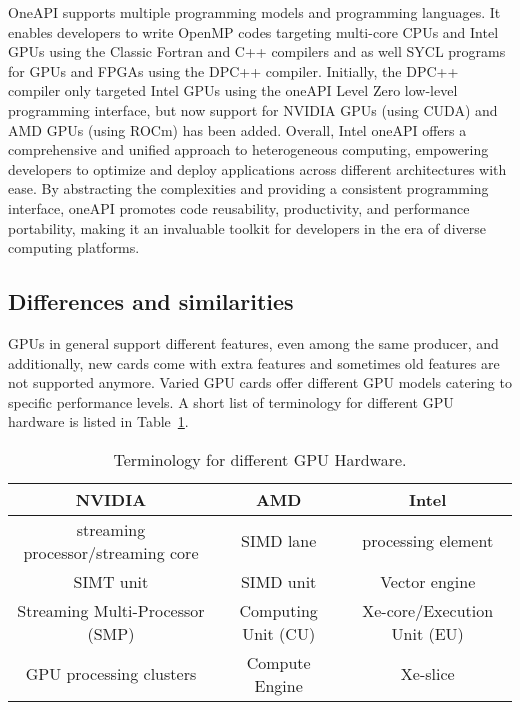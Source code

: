 \par
OneAPI supports multiple programming models and programming languages.
It enables developers to write OpenMP codes targeting multi-core CPUs and Intel GPUs using the Classic Fortran and C++ compilers and as well SYCL programs for GPUs and FPGAs using the DPC++ compiler.
Initially, the DPC++ compiler only targeted Intel GPUs using the oneAPI Level Zero low-level programming interface, but now support for NVIDIA GPUs (using CUDA) and AMD GPUs (using ROCm) has been added.
Overall, Intel oneAPI offers a comprehensive and unified approach to heterogeneous computing, empowering developers to optimize and deploy applications across different architectures with ease.
By abstracting the complexities and providing a consistent programming interface, oneAPI promotes code reusability, productivity, and performance portability, making it an invaluable toolkit for developers in the era of diverse computing platforms.




\subsection{Differences and similarities}


\par
GPUs in general support different features, even among the same producer, and additionally, new cards come with extra features and sometimes old features are not supported anymore.
Varied GPU cards offer different GPU models catering to specific performance levels.
A short list of terminology for different GPU hardware is listed in Table~\ref{tbl:gpu_terminology_nvidia_amd_intel}.


\begin{table}[!h]
\centering\caption{Terminology for different GPU Hardware.}\label{tbl:gpu_terminology_nvidia_amd_intel}
\begin{tabular}{ |c|c|c| } 
\hline
\textbf{NVIDIA} & \textbf{AMD} & \textbf{Intel} \\
\hline
streaming processor/streaming core & SIMD lane & processing element \\
SIMT unit & SIMD unit & Vector engine \\
Streaming Multi-Processor (SMP) & Computing Unit (CU) & Xe-core/Execution Unit (EU) \\
GPU processing clusters & Compute Engine & Xe-slice \\
\hline
\end{tabular}
\end{table}


